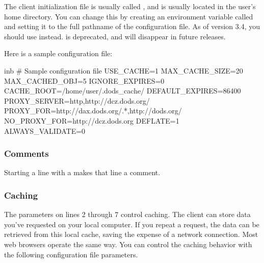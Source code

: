 The client initialization file is usually called , and is
usually located in the user's home directory.  You can change this by
creating an environment variable called  and
setting it to the full pathname of the configuration file.  As of \opendap
version 3.4, you should use  instead.
 is deprecated, and will disappear in future
releases.

Here is a sample configuration file:

\begin{vcode}{inb}
# Sample configuration file
USE_CACHE=1
MAX_CACHE_SIZE=20
MAX_CACHED_OBJ=5
IGNORE_EXPIRES=0
CACHE_ROOT=/home/user/.dods_cache/
DEFAULT_EXPIRES=86400
PROXY_SERVER=http,http://dcz.dods.org/
PROXY_FOR=http://dax.dods.org/.*,http://dods.org/
NO_PROXY_FOR=http://dcz.dods.org
DEFLATE=1
ALWAYS_VALIDATE=0
\end{vcode}    

\subsubsection{Comments}

Starting a line with a \lit{\#} makes that line a comment. 

\subsubsection{Caching}

The parameters on lines 2 through 7 control caching.  The \opendap client
can store data you've requested on your local computer.  If you repeat
a request, the data can be retrieved from this local cache, saving the
expense of a network connection.  Most web browsers operate the same
way.  You can control the caching behavior with the following
configuration file parameters.


